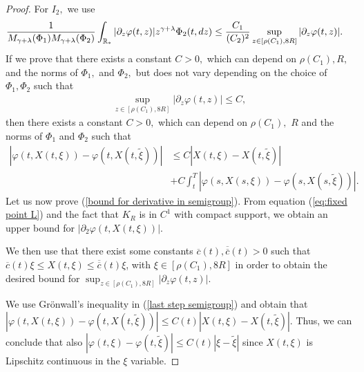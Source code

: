 \documentclass[11pt]{article}
\numberwithin{equation}{section}
\theoremstyle{plain}
\newcommand{\der}{\textup{d}}
\begin{document}
\begin{proof}
For $I_{2},$ we use
   \begin{align*}
   & \frac{1}{M_{\gamma+\lambda}(\Phi_1)  M_{\gamma+\lambda}(\Phi_2)  }\int_{\mathbb R_*} |\partial_z \varphi(t, z)| z^{\gamma+\lambda} \Phi_2(t, \der z)\leq \frac{C_{1}}{(C_{2})^{2}}\sup_{z\in[\rho(C_{1}),8R]}|\partial_z \varphi(t, z)|.
\end{align*}
If we prove that there exists a constant $C>0,$ which can depend on $\rho(C_{1}),R,$ and the norms of $\Phi_{1},$ and $\Phi_{2},$ but does not vary depending on the choice of $\Phi_{1},\Phi_{2}$ such that \begin{align}\label{bound for derivative in semigroup}
    \sup_{z\in[\rho(C_{1}),8R]}|\partial_z \varphi(t, z)|\leq C,
\end{align}
then there exists a constant $C>0,$ which can depend on $\rho(C_{1}),$ $R$ and the norms of $\Phi_{1}$ and $\Phi_{2}$ such that 
\begin{align}\label{last step semigroup}
    |\varphi(t,X(t,\xi))-\varphi(t,X(t,\tilde{\xi}))|&\leq C |X(t,\xi)-X(t,\tilde{\xi})|\nonumber\\
    &+ C\int_{t}^{T}    |\varphi(s,X(s,\xi))-\varphi(s,X(s,\tilde{\xi}))|.
\end{align}
Let us now prove (\ref{bound for derivative in semigroup}). From equation (\ref{eq:fixed point L}) and the fact that $K_{R}$ is in $C^{1}$ with compact support, we obtain an upper bound for $|\partial_{2}\varphi(t,X(t,\xi))|$.


We then use that there exist some constants $\overline{c}(t), \overline{\overline{c}}(t)>0$ such that $\overline{c}(t)\xi\leq  X(t,\xi)\leq \overline{\overline{c}}(t)\xi$, with $\xi\in[\rho(C_{1}),8R]$ in order to obtain the desired bound for $\sup_{z\in[\rho(C_{1}),8R]}|\partial_z \varphi(t, z)|$.

We use Gr\"{o}nwall's inequality in (\ref{last step semigroup}) and obtain that $|\varphi(t,X(t,\xi))-\varphi(t,X(t,\tilde{\xi}))|\leq C(t) |X(t,\xi)-X(t,\tilde{\xi})|.$ Thus, we can conclude that also $|\varphi(t,\xi)-\varphi(t,\tilde{\xi})|\leq C(t) |\xi-\tilde{\xi}|$ since $X(t,\xi)$ is Lipschitz continuous in the $\xi$ variable.
\end{proof}
\end{document}
